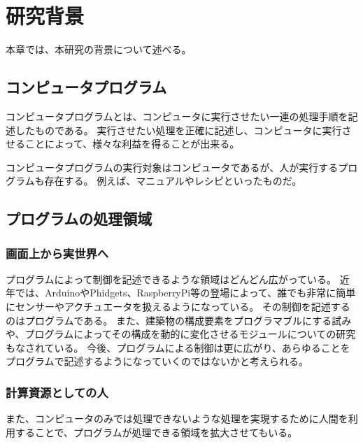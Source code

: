 \chapter{研究背景}\label{chap:background}

本章では、本研究の背景について述べる。

\section{コンピュータプログラム}\label{ux30b3ux30f3ux30d4ux30e5ux30fcux30bfux30d7ux30edux30b0ux30e9ux30e0}

コンピュータプログラムとは、コンピュータに実行させたい一連の処理手順を記述したものである。
実行させたい処理を正確に記述し、コンピュータに実行させることによって、様々な利益を得ることが出来る。

コンピュータプログラムの実行対象はコンピュータであるが、人が実行するプログラムも存在する。
例えば、マニュアルやレシピといったものだ。

\section{プログラムの処理領域}\label{ux30d7ux30edux30b0ux30e9ux30e0ux306eux51e6ux7406ux9818ux57df}

\subsection{画面上から実世界へ}\label{ux753bux9762ux4e0aux304bux3089ux5b9fux4e16ux754cux3078}

プログラムによって制御を記述できるような領域はどんどん広がっている。
近年では、ArduinoやPhidgets、RaspberryPi等の登場によって、誰でも非常に簡単にセンサーやアクチュエータを扱えるようになっている。
その制御を記述するのはプログラムである。
また、建築物の構成要素をプログラマブルにする試みや、プログラムによってその構成を動的に変化させるモジュールについての研究もなされている。
今後、プログラムによる制御は更に広がり、あらゆることをプログラムで記述するようになっていくのではないかと考えられる。

\subsection{計算資源としての人}\label{ux8a08ux7b97ux8cc7ux6e90ux3068ux3057ux3066ux306eux4eba}

また、コンピュータのみでは処理できないような処理を実現するために人間を利用することで、プログラムが処理できる領域を拡大させてもいる。


